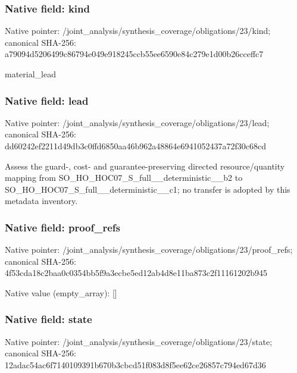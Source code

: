 \documentclass[10pt,a4paper]{article}
\begin{document}
\subsubsection{Native field: kind}
Native pointer: /joint\_\allowbreak{}analysis/synthesis\_\allowbreak{}coverage/obligations/23/kind; canonical SHA-256: a79094d5206499c86794e049e918245ccb55ee6590e84c279e1d00b26cceffc7

\begingroup\raggedright\sloppy material\_\allowbreak{}lead\par\endgroup

\subsubsection{Native field: lead}
Native pointer: /joint\_\allowbreak{}analysis/synthesis\_\allowbreak{}coverage/obligations/23/lead; canonical SHA-256: dd60242ef2211d49db3c0ffd6850aa46b962a48864e6941052437a72f30c68cd

\begingroup\raggedright\sloppy Assess the guard-,\allowbreak{} cost- and guarantee-preserving directed resource/\allowbreak{}quantity mapping from SO\_\allowbreak{}HO\_\allowbreak{}HOC07\_\allowbreak{}S\_\allowbreak{}full\_\allowbreak{}\_\allowbreak{}deterministic\_\allowbreak{}\_\allowbreak{}b2 to SO\_\allowbreak{}HO\_\allowbreak{}HOC07\_\allowbreak{}S\_\allowbreak{}full\_\allowbreak{}\_\allowbreak{}deterministic\_\allowbreak{}\_\allowbreak{}c1;\allowbreak{} no transfer is adopted by this metadata inventory.\par\endgroup

\subsubsection{Native field: proof\_\allowbreak{}refs}
Native pointer: /joint\_\allowbreak{}analysis/synthesis\_\allowbreak{}coverage/obligations/23/proof\_\allowbreak{}refs; canonical SHA-256: 4f53cda18c2baa0c0354bb5f9a3ecbe5ed12ab4d8e11ba873c2f11161202b945

Native value (empty\_\allowbreak{}array): []

\subsubsection{Native field: state}
Native pointer: /joint\_\allowbreak{}analysis/synthesis\_\allowbreak{}coverage/obligations/23/state; canonical SHA-256: 12adac54ac6f7140109391b670b3cbcd51f083d8f5ee62ce26857c794ed67d36
\end{document}
